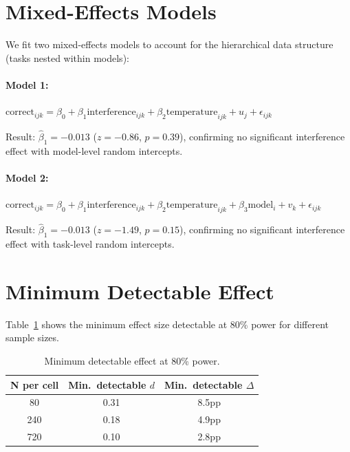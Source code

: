 \documentclass[11pt]{article}
\begin{document}
\section{Mixed-Effects Models}

We fit two mixed-effects models to account for the hierarchical data structure (tasks nested within models):

\paragraph{Model 1:} $\text{correct}_{ijk} = \beta_0 + \beta_1 \text{interference}_{ijk} + \beta_2 \text{temperature}_{ijk} + u_j + \epsilon_{ijk}$

Result: $\hat{\beta}_1 = -0.013$ ($z = -0.86$, $p = 0.39$), confirming no significant interference effect with model-level random intercepts.

\paragraph{Model 2:} $\text{correct}_{ijk} = \beta_0 + \beta_1 \text{interference}_{ijk} + \beta_2 \text{temperature}_{ijk} + \beta_3 \text{model}_i + v_k + \epsilon_{ijk}$

Result: $\hat{\beta}_1 = -0.013$ ($z = -1.49$, $p = 0.15$), confirming no significant interference effect with task-level random intercepts.

\section{Minimum Detectable Effect}

Table~\ref{tab:mde} shows the minimum effect size detectable at 80\% power for different sample sizes.

\begin{table}[t]
\centering
\begin{tabular}{ccc}
\toprule
\textbf{N per cell} & \textbf{Min.\ detectable $d$} & \textbf{Min.\ detectable $\Delta$} \\
\midrule
80 & 0.31 & 8.5pp \\
240 & 0.18 & 4.9pp \\
720 & 0.10 & 2.8pp \\
\bottomrule
\end{tabular}
\caption{Minimum detectable effect at 80\% power.}
\label{tab:mde}
\end{table}
\end{document}
